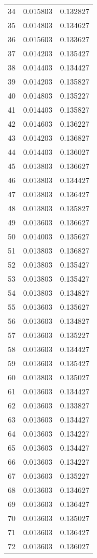 \begin{longtable}{rrr}
34 & 0.015803 & 0.132827 \\
35 & 0.014803 & 0.134627 \\
36 & 0.015603 & 0.133627 \\
37 & 0.014203 & 0.135427 \\
38 & 0.014403 & 0.134427 \\
39 & 0.014203 & 0.135827 \\
40 & 0.014803 & 0.135227 \\
41 & 0.014403 & 0.135827 \\
42 & 0.014603 & 0.136227 \\
43 & 0.014203 & 0.136827 \\
44 & 0.014403 & 0.136027 \\
45 & 0.013803 & 0.136627 \\
46 & 0.013803 & 0.134427 \\
47 & 0.013803 & 0.136427 \\
48 & 0.013803 & 0.135827 \\
49 & 0.013603 & 0.136627 \\
50 & 0.014003 & 0.135627 \\
51 & 0.013803 & 0.136827 \\
52 & 0.013803 & 0.135427 \\
53 & 0.013803 & 0.135427 \\
54 & 0.013803 & 0.134827 \\
55 & 0.013603 & 0.135627 \\
56 & 0.013603 & 0.134827 \\
57 & 0.013603 & 0.135227 \\
58 & 0.013603 & 0.134427 \\
59 & 0.013603 & 0.135427 \\
60 & 0.013803 & 0.135027 \\
61 & 0.013603 & 0.134427 \\
62 & 0.013603 & 0.133827 \\
63 & 0.013603 & 0.134427 \\
64 & 0.013603 & 0.134227 \\
65 & 0.013603 & 0.134427 \\
66 & 0.013603 & 0.134227 \\
67 & 0.013603 & 0.135227 \\
68 & 0.013603 & 0.134627 \\
69 & 0.013603 & 0.136427 \\
70 & 0.013603 & 0.135027 \\
71 & 0.013603 & 0.136427 \\
72 & 0.013603 & 0.136027 \\

\end{longtable}
